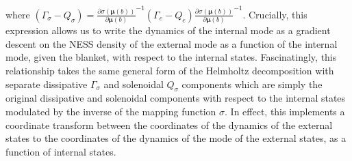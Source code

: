 where $(\Gamma_\sigma - Q_\sigma) = \frac{\partial \sigma(\bm{\mu}(b))}{\partial \bm{\mu}(b)}^{-1} (\Gamma_e - Q_e) \frac{\partial \sigma(\bm{\mu}(b))}{\partial \bm{\mu}(b)}^{-1}$. Crucially, this expression allows us to write the dynamics of the internal mode as a gradient descent on the NESS density of the external mode as a function of the internal mode, given the blanket, with respect to the internal states. Fascinatingly, this relationship takes the same general form of the Helmholtz decomposition with separate dissipative $\Gamma_\sigma$ and solenoidal $Q_\sigma$ components which are simply the original dissipative and solenoidal components with respect to the internal states modulated by the inverse of the mapping function $\sigma$. In effect, this implements a coordinate transform between the coordinates of the dynamics of the external states to the coordinates of the dynamics of the mode of the external states, as a function of internal states.

